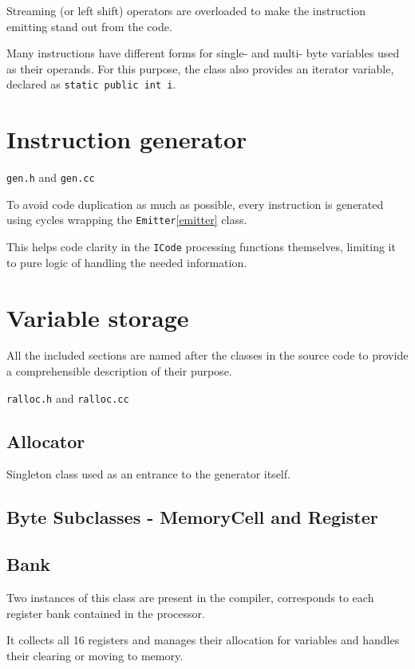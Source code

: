         Streaming (or left shift) operators are overloaded to make the instruction emitting stand out from the code.

        Many instructions have different forms for single- and multi- byte variables used as their operands. For this purpose, the class also provides an iterator variable, declared as \texttt{static public int i}.

    \section{Instruction generator}

    \texttt{gen.h} and \texttt{gen.cc}

    To avoid code duplication as much as possible, every instruction is generated using cycles wrapping the \texttt{Emitter}\ref{emitter} class.

    This helps code clarity in the \texttt{ICode} processing functions themselves, limiting it to pure logic of handling the needed information.

    \section{Variable storage}

    All the included sections are named after the classes in the source code to provide a comprehensible description of their purpose.

    \texttt{ralloc.h} and \texttt{ralloc.cc}

        \subsection{Allocator}

        Singleton class used as an entrance to the generator itself.

        \subsection{Byte Subclasses - MemoryCell and Register}

        \subsection{Bank}

        Two instances of this class are present in the compiler, corresponds to each register bank contained in the processor.

        It collects all 16 registers and manages their allocation for variables and handles their clearing or moving to memory.

